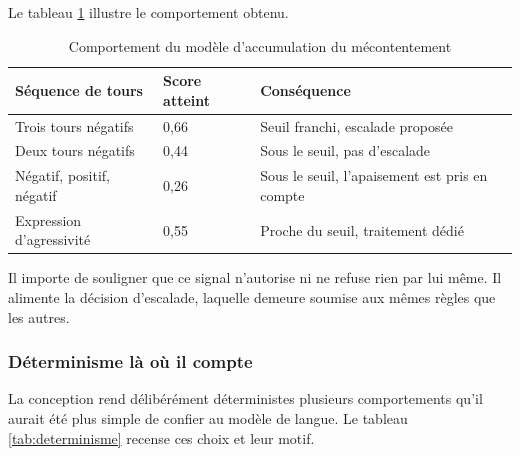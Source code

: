 Le tableau \ref{tab:sentiment} illustre le comportement obtenu.

\begin{table}[H]
\centering
\renewcommand{\arraystretch}{1.25}
\begin{tabular}{|p{6.5cm}|p{3.2cm}|p{4.5cm}|}
\hline
\textbf{Séquence de tours} & \textbf{Score atteint} & \textbf{Conséquence} \\
\hline
Trois tours négatifs & 0,66 & Seuil franchi, escalade proposée \\
\hline
Deux tours négatifs & 0,44 & Sous le seuil, pas d'escalade \\
\hline
Négatif, positif, négatif & 0,26 & Sous le seuil, l'apaisement est pris en compte \\
\hline
Expression d'agressivité & 0,55 & Proche du seuil, traitement dédié \\
\hline
\end{tabular}
\caption{Comportement du modèle d'accumulation du mécontentement}
\label{tab:sentiment}
\end{table}

Il importe de souligner que ce signal n'autorise ni ne refuse rien par lui même. Il alimente la décision d'escalade, laquelle demeure soumise aux mêmes règles que les autres.

\subsubsection{Déterminisme là où il compte}

La conception rend délibérément déterministes plusieurs comportements qu'il aurait été plus simple de confier au modèle de langue. Le tableau \ref{tab:determinisme} recense ces choix et leur motif.

